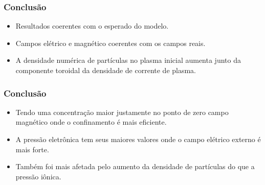 \documentclass[aspectratio=169]{beamer}
\begin{document}
   \begin{frame}
			\frametitle{Conclusão}
		\begin{itemize}
			 \item Resultados coerentes com o esperado do modelo. 
			 \item Campos elétrico e magnético coerentes com os campos reais.%
			 			 \item A densidade numérica de partículas no plasma inicial aumenta junto da componente toroidal da densidade de corrente de plasma. 
              
		\end{itemize}

	\end{frame}	

              

	

	\begin{frame}		
			\frametitle{Conclusão}
\begin{itemize} 
			 \item Tendo uma concentração maior justamente no ponto de zero campo magnético onde o confinamento é mais eficiente. 
			 \item A pressão eletrônica tem seus maiores valores onde o campo elétrico externo é mais forte. 
			 \item Também foi mais afetada pelo aumento da densidade de partículas do que a pressão iônica. 
\end{itemize}
\end{frame}
\end{document}
